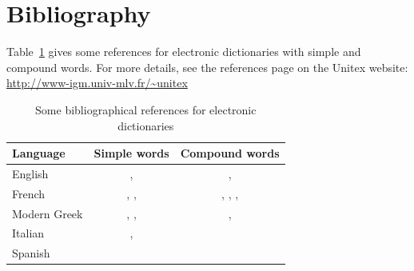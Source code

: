 \section{Bibliography}


Table~\ref{ref-dicos} gives some references for electronic dictionaries with simple and 
compound words. For more details, see the references page on the Unitex website: \\
\url{http://www-igm.univ-mlv.fr/~unitex}

\begin{table}[!h]
\begin{center}
\begin{tabular}{|l|c|c|}
\hline
\textbf{Language} & \textbf{Simple words} & \textbf{Compound words} \\
\hline
English & \cite{klarsfeld}, \cite{monceaux-1995} & \cite{delac-anglais},
\cite{these-Savary} \\
\hline
French & \cite{formes-ambigues}, \cite{dicos-francais}, \cite{jacques-1995} & \cite{dicos-francais},
\cite{Gross96},
\cite{max-1993},
\cite{syntaxe-de-ladverbe} \\
\hline
Modern Greek & \cite{modern-greek}, \cite{matthieu-anastasia}, \cite{these-tita} & \cite{tita-2002},
\cite{anastasia-2002} \\
\hline
Italian & \cite{delaf-italien}, \cite{delaf-italien-book} & \cite{composes-italien} \\
\hline
Spanish & \cite{blanco-2000} & \cite{blanco-1997} \\
\hline
\end{tabular}
\caption{Some bibliographical references for electronic dictionaries\label{ref-dicos}}
\end{center}
\end{table}
